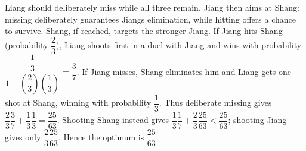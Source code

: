 Liang should deliberately miss while all three remain. Jiang then aims at Shang: missing deliberately guarantees Jiang\textquotesingle s elimination, while hitting offers a chance to survive. Shang, if reached, targets the stronger Jiang. If Jiang hits Shang (probability $\dfrac{2}{3}$), Liang shoots first in a duel with Jiang and wins with probability $\dfrac{\dfrac{1}{3}}{1-(\dfrac{2}{3})(\dfrac{1}{3})}=\dfrac{3}{7}$. If Jiang misses, Shang eliminates him and Liang gets one shot at Shang, winning with probability $\dfrac{1}{3}$. Thus deliberate missing gives $\dfrac{2}{3}\dfrac{3}{7}+\dfrac{1}{3}\dfrac{1}{3}=\dfrac{25}{63}$. Shooting Shang instead gives $\dfrac{1}{3}\dfrac{1}{7}+\dfrac{2}{3}\dfrac{25}{63}<\dfrac{25}{63}$; shooting Jiang gives only $\dfrac{2}{3}\dfrac{25}{63}$. Hence the optimum is $\boxed{\dfrac{25}{63}}$.
